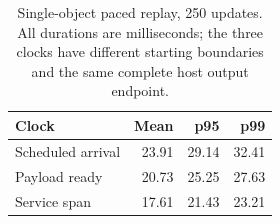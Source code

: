 \begin{table}[t]
\centering\small
\caption{Single-object paced replay, 250 updates. All durations are milliseconds;
the three clocks have different starting boundaries and the same complete host output endpoint.}
\label{tab:runtime}
\begin{tabular}{lrrr}
\toprule
Clock & Mean & p95 & p99 \\
\midrule
Scheduled arrival & 23.91 & 29.14 & 32.41 \\
Payload ready & 20.73 & 25.25 & 27.63 \\
Service span & 17.61 & 21.43 & 23.21 \\
\bottomrule
\end{tabular}
\end{table}
